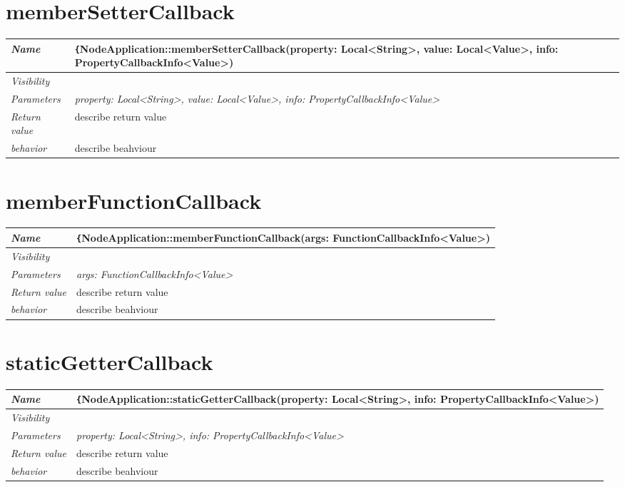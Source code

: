  \pagebreak\n\section{memberSetterCallback}
\begin{longtable}{p{3cm} @{\hskip 1cm} p{12cm}}
 \hline
\textit{Name} & \texttt\{NodeApplication::memberSetterCallback(property: Local<String>, value: Local<Value>, info: PropertyCallbackInfo<Value>)}\\
\hline
 \textit{Visibility} & \\
\hline
\textit{Parameters} & \textit{property: Local<String>, value: Local<Value>, info: PropertyCallbackInfo<Value>}\\
\hline
\textit{Return value} & \textbf{} describe return value\\
  \hline
  \textit{behavior} & describe beahviour \\
  \hline
\end{longtable}
 \pagebreak\n\section{memberFunctionCallback}
\begin{longtable}{p{3cm} @{\hskip 1cm} p{12cm}}
 \hline
\textit{Name} & \texttt\{NodeApplication::memberFunctionCallback(args: FunctionCallbackInfo<Value>)}\\
\hline
 \textit{Visibility} & \\
\hline
\textit{Parameters} & \textit{args: FunctionCallbackInfo<Value>}\\
\hline
\textit{Return value} & \textbf{} describe return value\\
  \hline
  \textit{behavior} & describe beahviour \\
  \hline
\end{longtable}
 \pagebreak\n\section{staticGetterCallback}
\begin{longtable}{p{3cm} @{\hskip 1cm} p{12cm}}
 \hline
\textit{Name} & \texttt\{NodeApplication::staticGetterCallback(property: Local<String>, info: PropertyCallbackInfo<Value>)}\\
\hline
 \textit{Visibility} & \\
\hline
\textit{Parameters} & \textit{property: Local<String>, info: PropertyCallbackInfo<Value>}\\
\hline
\textit{Return value} & \textbf{} describe return value\\
  \hline
  \textit{behavior} & describe beahviour \\
  \hline
\end{longtable}
